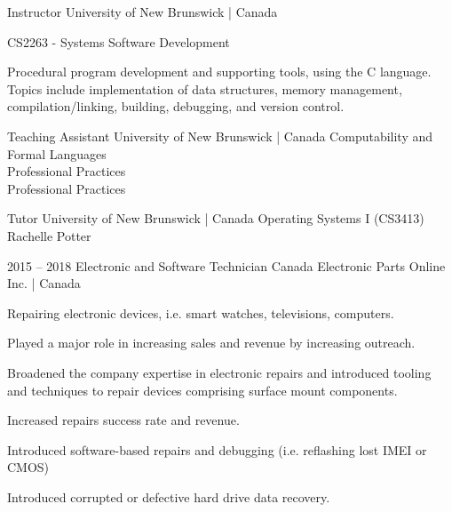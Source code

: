 \documentclass[9.5pt]{developercv} %
\begin{document}
\begin{entrylist}
        {Instructor}
        {University of New Brunswick | Canada}{ 
            \textbullet{} CS2263 - Systems Software Development
            \begin{quoting}
            Procedural program development and supporting tools, using the C language. 
            Topics include implementation of data structures, memory management, compilation/linking, building, debugging, and version control. 
            \end{quoting}
            }

        {Teaching Assistant}
        {University of New Brunswick | Canada}
        {        
            \textbullet{} Computability and Formal Languages\\
            \textbullet{} Professional Practices\\
            \textbullet{} Professional Practices\\
            }

        {Tutor}
        {University of New Brunswick | Canada}{        
            \textbullet{} Operating Systems I (CS3413) Rachelle Potter
            }
            
    \entry
        {2015 -- 2018}
        {Electronic and Software Technician}
        {Canada Electronic Parts Online Inc. | Canada}{  
            Repairing electronic devices, i.e. smart watches, televisions, computers.
            \begin{tightemize}
            \item Played a major role in increasing sales and revenue by increasing outreach.
            \item Broadened the company expertise in electronic repairs and introduced tooling and techniques to repair devices comprising surface mount components.
            \item Increased repairs success rate and revenue.
            \item Introduced software-based repairs and debugging (i.e. reflashing lost IMEI or CMOS)
            \item Introduced corrupted or defective hard drive data recovery.
            \end{tightemize}
            }

\end{entrylist}
\end{document}
